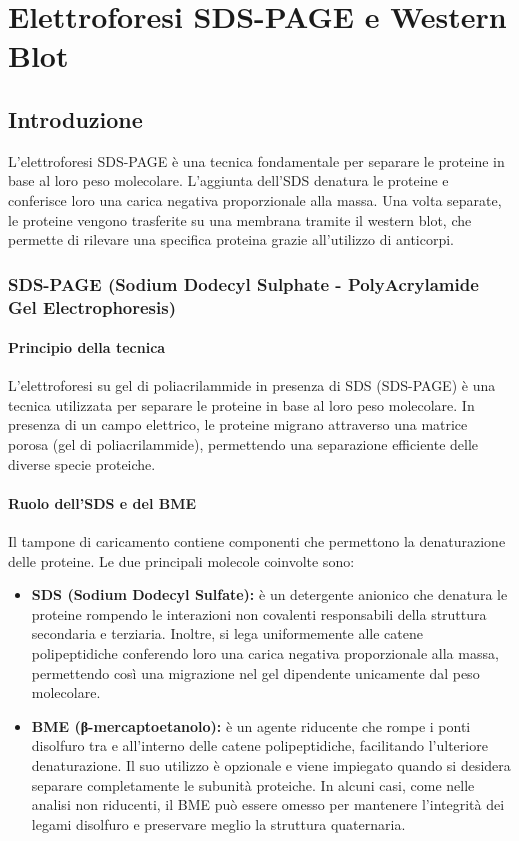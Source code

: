 \section {Elettroforesi SDS-PAGE e Western Blot}

\subsection{Introduzione}
L'elettroforesi SDS-PAGE è una tecnica fondamentale per separare le proteine in base al loro peso molecolare. L'aggiunta dell'SDS denatura le proteine e conferisce loro una carica negativa proporzionale alla massa. Una volta separate, le proteine vengono trasferite su una membrana tramite il western blot, che permette di rilevare una specifica proteina grazie all’utilizzo di anticorpi.

\subsubsection{SDS-PAGE (Sodium Dodecyl Sulphate - PolyAcrylamide Gel Electrophoresis)}

\paragraph{Principio della tecnica}
L'elettroforesi su gel di poliacrilammide in presenza di SDS (SDS-PAGE) è una tecnica utilizzata per separare le proteine in base al loro peso molecolare. In presenza di un campo elettrico, le proteine migrano attraverso una matrice porosa (gel di poliacrilammide), permettendo una separazione efficiente delle diverse specie proteiche.

\paragraph{Ruolo dell'SDS e del BME}
Il tampone di caricamento contiene componenti che permettono la denaturazione delle proteine. Le due principali molecole coinvolte sono:

\begin{itemize}
  \item \textbf{SDS (Sodium Dodecyl Sulfate):} è un detergente anionico che denatura le proteine rompendo le interazioni non covalenti responsabili della struttura secondaria e terziaria. Inoltre, si lega uniformemente alle catene polipeptidiche conferendo loro una carica negativa proporzionale alla massa, permettendo così una migrazione nel gel dipendente unicamente dal peso molecolare.
  
  \item \textbf{BME (β-mercaptoetanolo):} è un agente riducente che rompe i ponti disolfuro tra e all'interno delle catene polipeptidiche, facilitando l’ulteriore denaturazione. Il suo utilizzo è opzionale e viene impiegato quando si desidera separare completamente le subunità proteiche. In alcuni casi, come nelle analisi non riducenti, il BME può essere omesso per mantenere l'integrità dei legami disolfuro e preservare meglio la struttura quaternaria.
\end{itemize}



